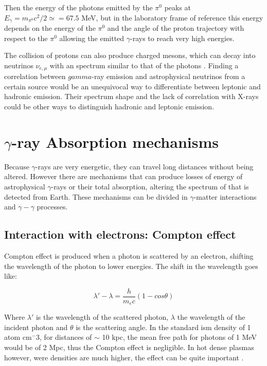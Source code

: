 \documentclass[main.tex]{subfiles}
\begin{document}
Then the energy of the photons emitted by the $\pi^{0}$ peaks at $E_{\gamma} = m_{\pi^{0}}c^{2}/2 \simeq = 67.5$ MeV, but in the laboratory frame of reference this energy depends on the energy of the $\pi^{0}$ and the angle of the proton trajectory with respect to the $\pi^{0}$ allowing the emitted $\gamma$-rays to reach very high energies.

The collision of protons can also produce charged mesons, which can decay into neutrinos $\nu_{e,\mu}$ with an spectrum similar to that of the photons \cite{2004VHECosmicGammaRadiation}. Finding a correlation between $gamma$-ray emission and astrophysical neutrinos from a certain source would be an unequivocal way to differentiate between leptonic and hadronic emission. Their spectrum shape and the lack of correlation with X-rays could be other ways to distinguish hadronic and leptonic emission. 


\section{$\gamma$-ray Absorption mechanisms} \label{sec:absorption}

Because $\gamma$-rays are very energetic, they can travel long distances without being altered. However there are mechanisms that can produce losses of energy of astrophysical $\gamma$-rays or their total absorption, altering the spectrum of that is detected from Earth. These mechanisms can be divided in $\gamma$-matter interactions and $\gamma-\gamma$ processes.

\subsection{Interaction with electrons: Compton effect}

Compton effect is produced when a photon is scattered by an electron, shifting the wavelength of the photon to lower energies. The shift in the wavelength goes like:

\begin{equation}
    \lambda '-\lambda = \frac{h}{m_e c}(1-cos\theta)    
\end{equation}

Where $\lambda'$ is the wavelength of the scattered photon, $\lambda$ the wavelength of the incident photon and $\theta$ is the scattering angle. In the standard \gls{ism} density of 1 atom cm$^-3$, for distances of $\sim$ 10 kpc, the mean free path for photons of 1 MeV would be of 2 Mpc, thus the Compton effect is negligible. In hot dense plasmas however, were densities are much higher, the effect can be quite important \cite{1993MurthyGammaRay}.
\end{document}
